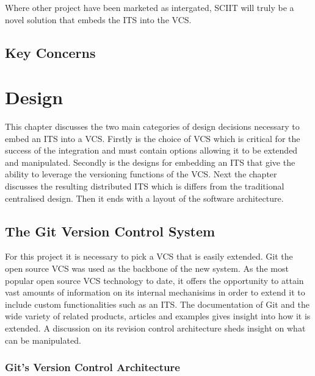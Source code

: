 \documentclass{mproj}
\begin{document}
Where other project have been marketed as intergated, SCIIT will truly be a novel solution that embeds the ITS into the VCS. 

\section{Key Concerns}



\chapter{Design}\label{design}

This chapter discusses the two main categories of design decisions necessary to embed an ITS into a VCS. Firstly is the choice of VCS which is critical for the success of the integration and must contain options allowing it to be extended and manipulated. Secondly is the designs for embedding an ITS that give the ability to leverage the versioning functions of the VCS. Next the chapter discusses the resulting distributed ITS which is differs from the traditional centralised design. Then it ends with a layout of the software architecture.




\section{The Git Version Control System}

For this project it is necessary to pick a VCS that is easily extended. Git the open source VCS was used as the backbone of the new system. As the most popular open source VCS  technology to date, it offers the opportunity to attain vast amounts of information on its internal mechanisims in order to extend it to include custom functionalities such as an ITS. The documentation of Git and the wide variety of related products, articles and examples gives insight into how it is extended. A discussion on its revision control architecture sheds insight on what can be manipulated.



\subsection{Git's Version Control Architecture}
\end{document}
